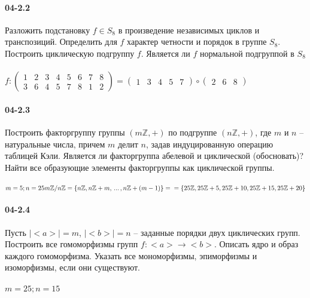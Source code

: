 \documentclass[12pt]{article}
\begin{document}
	\paragraph{04-2.2} Разложить подстановку $f \in S_{8}$ в произведение независимых циклов и транспозиций. Определить для $f$ характер четности и порядок в группе $S_{8}$. Построить циклическую подгруппу $f$. Является ли $f$ нормальной подгруппой в $S_{8}$
 \\ \\
 	\ensuremath{
	 	f : \begin{pmatrix}
	 		1 & 2 & 3 & 4 & 5 & 6 & 7 & 8 \\
	 		3 & 6 & 4 & 5 & 7 & 8 & 1 & 2
	 	\end{pmatrix}
	 	= \begin{pmatrix} 1 & 3 & 4 & 5 & 7 \end{pmatrix} \circ
	 	  \begin{pmatrix} 2 & 6 & 8 \end{pmatrix}
	 }
	\clearpage
	\paragraph{04-2.3} Построить факторгруппу группы $(m\mathbb{Z}, +)$ по подгруппе $(n\mathbb{Z}, +)$, где $m$ и $n$ – натуральные числа, причем $m$ делит $n$, задав индуцированную операцию таблицей Кэли. Является ли факторгруппа абелевой и циклической (обосновать)? Найти все образующие элементы факторгруппы как циклической группы.
	\\ \\
	\ensuremath{ 
		m = 5; n = 25  \\
		\\
		m\mathbb{Z}/n\mathbb{Z} = \{ n\mathbb{Z}, n\mathbb{Z} + m, \, ... \, , n\mathbb{Z} + (m - 1) \} = \\
		= \{ 25\mathbb{Z}, 25\mathbb{Z} + 5, 25\mathbb{Z} + 10, 25\mathbb{Z} + 15, 25\mathbb{Z} + 20 \} \\
	}
	\clearpage
	\paragraph{04-2.4} Пусть $| <a> | = m$, $| <b>| = n$ – заданные порядки двух циклических групп. Построить все гомоморфизмы групп $f : <a> \rightarrow <b>$. Описать ядро и образ каждого гомоморфизма. Указать все мономорфизмы, эпиморфизмы и изоморфизмы, если они существуют.
	\\ \\
	\ensuremath{ m = 25; n = 15 }
	\clearpage
\end{document}
